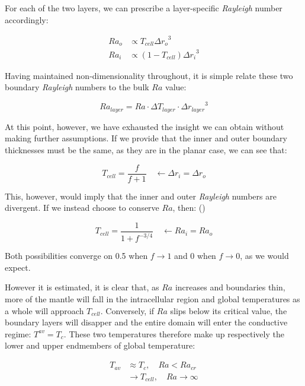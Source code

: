 \documentclass[a4paper,11pt,oneside]{book}
\begin{document}
For each of the two layers, we can prescribe a layer-specific \textit{Rayleigh} number accordingly:

\begin{align*}
Ra_o &\propto T_{cell} {{\Delta r}_o}^3 \\
Ra_i &\propto (1 - T_{cell}) {{\Delta r}_i}^3
\end{align*}

Having maintained non-dimensionality throughout, it is simple relate these two boundary \textit{Rayleigh} numbers to the bulk $Ra$ value:

\begin{equation}
Ra_{layer} = Ra \cdot {\Delta T}_{layer} \cdot {{\Delta r}_{layer}}^3
\end{equation}

At this point, however, we have exhausted the insight we can obtain without making further assumptions. If we provide that the inner and outer boundary thicknesses must be the same, as they are in the planar case, we can see that:

\begin{equation}
T_{cell} = \frac{f}{f + 1} \quad \leftarrow {\Delta r}_i = {\Delta r}_o
\end{equation}

This, however, would imply that the inner and outer \textit{Rayleigh} numbers are divergent. If we instead choose to conserve $Ra$, then: (\cite{Jarvis1993-cb})

\begin{equation}
T_{cell} = \frac{1}{1 + f^{-3/4}} \quad \leftarrow Ra_i = Ra_o
\end{equation}

Both possibilities converge on 0.5 when $f\to1$ and 0 when $f\to0$, as we would expect.

However it is estimated, it is clear that, as $Ra$ increases and boundaries thin, more of the mantle will fall in the intracellular region and global temperatures as a whole will approach $T_{cell}$. Conversely, if $Ra$ slips below its critical value, the boundary layers will disapper and the entire domain will enter the conductive regime: $T^{av} = T_{c}$. These two temperatures therefore make up respectively the lower and upper endmembers of global temperature:

\begin{align*}
T_{av} &\approx T_{c}, \quad Ra < Ra_{cr} \\
&\to T_{cell}, \quad Ra \to \infty
\end{align*}
\end{document}
